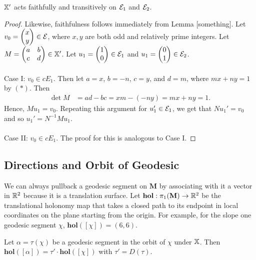 \documentclass[]{article}
\def\hol{\mathbf{hol}}
\def\bM{\mathbf{M}}
\begin{document}
\begin{lem}
$\mathbb{X}'$ acts faithfully and transitively on $\mathcal{E}_1$ and $\mathcal{E}_2$.
\begin{proof}
Likewise, faithfulness follows immediately from Lemma [something]. Let $v_0=\begin{pmatrix}x \\ y\end{pmatrix}\in\mathcal{E}$, where $x,y$ are both odd and relatively prime integers. Let $M=\begin{pmatrix}a & b \\ c & d
\end{pmatrix}\in\mathbb{X}'$. Let $u_1=\begin{pmatrix}1 \\ 0 \end{pmatrix}\in\mathcal{E}_1$ and $u_1=\begin{pmatrix}0 \\ 1 \end{pmatrix}\in\mathcal{E}_2$.\\\\
Case I: $v_0\in cE_1$. Then let $a=x$, $b=-n$, $c=y$, and $d=m$, where $mx+ny=1$ by $(*)$. Then
\begin{align*}
\det M &= ad-bc=xm-(-ny)=mx+ny=1.
\end{align*}
Hence, $Mu_1=v_0$. Repeating this argument for $u_1'\in \mathcal{E}_1$, we get that $Nu_1'=v_0$ and so $u_1'=N^{-1}Mu_1$.\\\\
Case II: $v_0\in cE_1$. The proof for this is analogous to Case I.
\end{proof}
\end{lem}

\subsection{Directions and Orbit of Geodesic}
We can always pullback a geodesic segment on $\bM$ by associating with it a vector in $\mathbb{R}^2$ because it is a translation surface. Let $\hol:\pi_1(\bM)\rightarrow\RR^2$ be the translational holonomy map that takes a closed path to its endpoint in local coordinates on the plane starting from the origin. For example, for the slope one geodesic segment $\chi$, $\hol([\chi])=(6,6)$.

\begin{lem}
Let $\alpha=\tau(\chi)$ be a geodesic segment in the orbit of $\chi$ under $\mathbb{X}$. Then $\hol([\alpha])=\tau'\cdot\hol([\chi])$ with $\tau'=D(\tau)$. 
\end{lem}
\end{document}
